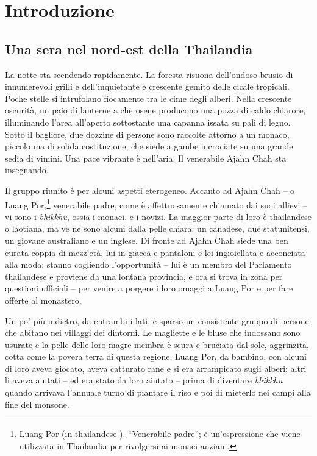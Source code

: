 \chapter{Introduzione}

\section{Una sera nel nord-est della Thailandia}

La notte sta scendendo rapidamente. La foresta risuona dell'ondoso
brusio di innumerevoli grilli e dell'inquietante e crescente gemito
delle cicale tropicali. Poche stelle si intrufolano fiocamente tra le
cime degli alberi. Nella crescente oscurità, un paio di lanterne a
cherosene producono una pozza di caldo chiarore, illuminando l'area
all'aperto sottostante una capanna issata su pali di legno. Sotto il
bagliore, due dozzine di persone sono raccolte attorno a un monaco,
piccolo ma di solida costituzione, che siede a gambe incrociate su una
grande sedia di vimini. Una pace vibrante è nell'aria. Il venerabile
Ajahn Chah sta insegnando.

Il gruppo riunito è per alcuni aspetti eterogeneo. Accanto ad Ajahn Chah
-- o Luang Por,\footnote{Luang Por (in thailandese ).
  ``Venerabile padre''; è un'espressione che viene utilizzata in
  Thailandia per rivolgersi ai monaci anziani.} venerabile padre, come è
affettuosamente chiamato dai suoi allievi -- vi sono i \emph{bhikkhu},
ossia i monaci, e i novizi. La maggior parte di loro è thailandese o
laotiana, ma ve ne sono alcuni dalla pelle chiara: un canadese, due
statunitensi, un giovane australiano e un inglese. Di fronte ad Ajahn
Chah siede una ben curata coppia di mezz'età, lui in giacca e pantaloni
e lei ingioiellata e acconciata alla moda; stanno cogliendo
l'opportunità -- lui è un membro del Parlamento thailandese e proviene
da una lontana provincia, e ora si trova in zona per questioni ufficiali
-- per venire a porgere i loro omaggi a Luang Por e per fare offerte al
monastero.

Un po' più indietro, da entrambi i lati, è sparso un consistente gruppo
di persone che abitano nei villaggi dei dintorni. Le magliette e le
bluse che indossano sono usurate e la pelle delle loro magre membra è
scura e bruciata dal sole, aggrinzita, cotta come la povera terra di
questa regione. Luang Por, da bambino, con alcuni di loro aveva giocato,
aveva catturato rane e si era arrampicato sugli alberi; altri li aveva
aiutati -- ed era stato da loro aiutato -- prima di diventare
\emph{bhikkhu} quando arrivava l'annuale turno di piantare il riso e poi
di mieterlo nei campi alla fine del monsone.

